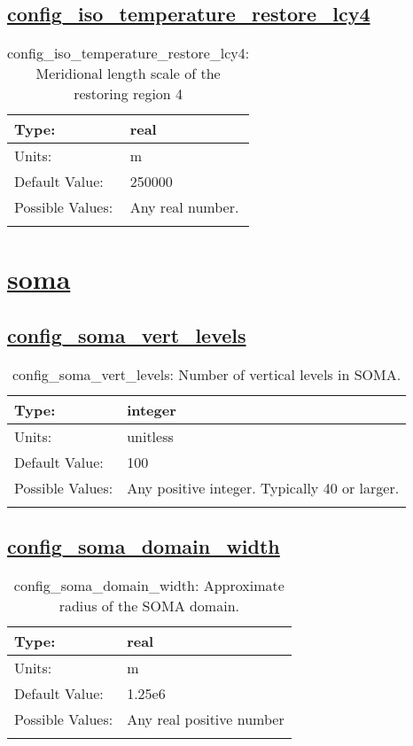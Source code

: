 \subsection[config\_iso\_temperature\_restore\_lcy4]{\hyperref[sec:nm_tab_iso]{config\_iso\_temperature\_restore\_lcy4}}
\label{subsec:nm_sec_config_iso_temperature_restore_lcy4}
\begin{center}
\begin{longtable}{| p{2.0in} || p{4.0in} |}
    \hline
    Type: & real \\
    \hline
    Units: & \si{m} \\
    \hline
    Default Value: & 250000 \\
    \hline
    Possible Values: & Any real number. \\
    \hline
    \caption{config\_iso\_temperature\_restore\_lcy4: Meridional length scale of the restoring region 4}
\end{longtable}
\end{center}
\section[soma]{\hyperref[sec:nm_tab_soma]{soma}}
\label{sec:nm_sec_soma}
\subsection[config\_soma\_vert\_levels]{\hyperref[sec:nm_tab_soma]{config\_soma\_vert\_levels}}
\label{subsec:nm_sec_config_soma_vert_levels}
\begin{center}
\begin{longtable}{| p{2.0in} || p{4.0in} |}
    \hline
    Type: & integer \\
    \hline
    Units: & \si{unitless} \\
    \hline
    Default Value: & 100 \\
    \hline
    Possible Values: & Any positive integer. Typically 40 or larger. \\
    \hline
    \caption{config\_soma\_vert\_levels: Number of vertical levels in SOMA.}
\end{longtable}
\end{center}
\subsection[config\_soma\_domain\_width]{\hyperref[sec:nm_tab_soma]{config\_soma\_domain\_width}}
\label{subsec:nm_sec_config_soma_domain_width}
\begin{center}
\begin{longtable}{| p{2.0in} || p{4.0in} |}
    \hline
    Type: & real \\
    \hline
    Units: & \si{m} \\
    \hline
    Default Value: & 1.25e6 \\
    \hline
    Possible Values: & Any real positive number \\
    \hline
    \caption{config\_soma\_domain\_width: Approximate radius of the SOMA domain.}
\end{longtable}
\end{center}
